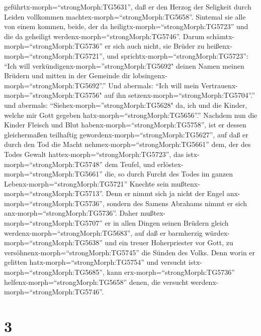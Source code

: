 geführtx-morph=``strongMorph:TG5631'', daß er den Herzog der Seligkeit
durch Leiden vollkommen machtex-morph=``strongMorph:TG5658''.
 Sintemal sie alle von einem kommen, beide, der da
heiligtx-morph=``strongMorph:TG5723'' und die da geheiligt
werdenx-morph=``strongMorph:TG5746''. Darum
schämtx-morph=``strongMorph:TG5736'' er sich auch nicht, sie Brüder zu
heißenx-morph=``strongMorph:TG5721'',  und
sprichtx-morph=``strongMorph:TG5723'': ``Ich will
verkündigenx-morph=''strongMorph:TG5692" deinen Namen meinen Brüdern und
mitten in der Gemeinde dir lobsingenx-morph=``strongMorph:TG5692''.''
 Und abermals: ``Ich will mein
Vertrauenx-morph=''strongMorph:TG5756" auf ihn
setzenx-morph=``strongMorph:TG5704''.'' und abermals:
``Siehex-morph=''strongMorph:TG5628" da, ich und die Kinder, welche mir
Gott gegeben hatx-morph=``strongMorph:TG5656''.''  Nachdem
nun die Kinder Fleisch und Blut habenx-morph=``strongMorph:TG5758'', ist
er dessen gleichermaßen teilhaftig
gewordenx-morph=``strongMorph:TG5627'', auf daß er durch den Tod die
Macht nehmex-morph=``strongMorph:TG5661'' dem, der des Todes Gewalt
hattex-morph=``strongMorph:TG5723'', das
istx-morph=``strongMorph:TG5748'' dem Teufel,  und
erlöstex-morph=``strongMorph:TG5661'' die, so durch Furcht des Todes im
ganzen Lebenx-morph=``strongMorph:TG5721'' Knechte sein
mußtenx-morph=``strongMorph:TG5713''.  Denn er nimmt sich
ja nicht der Engel anx-morph=``strongMorph:TG5736'', sondern des Samens
Abrahams nimmt er sich anx-morph=``strongMorph:TG5736''. 
Daher mußtex-morph=``strongMorph:TG5707'' er in allen Dingen seinen
Brüdern gleich werdenx-morph=``strongMorph:TG5683'', auf daß er
barmherzig würdex-morph=``strongMorph:TG5638'' und ein treuer
Hoherpriester vor Gott, zu versöhnenx-morph=``strongMorph:TG5745'' die
Sünden des Volks.  Denn worin er gelitten
hatx-morph=``strongMorph:TG5754'' und versucht
istx-morph=``strongMorph:TG5685'', kann erx-morph=``strongMorph:TG5736''
helfenx-morph=``strongMorph:TG5658'' denen, die versucht
werdenx-morph=``strongMorph:TG5746''.

\hypertarget{section-2}{%
\section{3}\label{section-2}}

